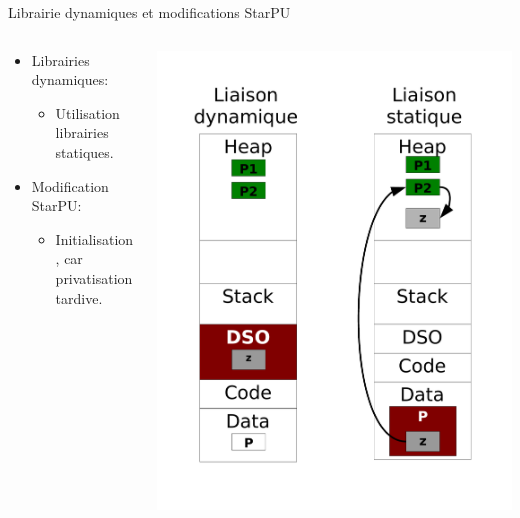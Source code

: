 \documentclass[11pt,xcolor=dvipsnames,presentation]{beamer}
\begin{document}
\begin{frame}[label=sec-4-2]{Librairie dynamiques et modifications StarPU}
\begin{columns}
  \begin{column}{.6\linewidth}

\begin{itemize}
\item Librairies dynamiques:
\begin{itemize}
\item Utilisation librairies statiques.
\end{itemize}
\item Modification StarPU:
\begin{itemize}
\item Initialisation, car privatisation tardive.
\end{itemize}
\end{itemize}
  \end{column}
  \begin{column}{.35\linewidth}
    \includegraphics[width=\linewidth]{../Img/StaticDyn.pdf}
  \end{column}
\end{columns}
\end{frame}
\end{document}
